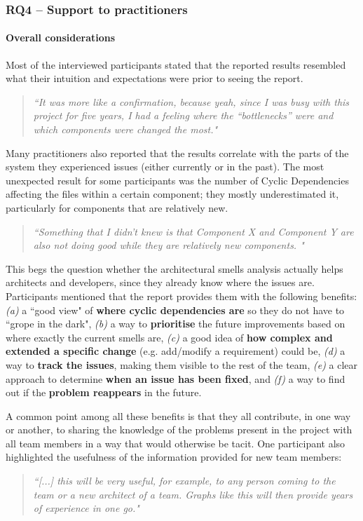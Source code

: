 \subsubsection{RQ4 -- Support to practitioners}\label{c4:sec:results-rq-4}
\paragraph{Overall considerations}
Most of the interviewed participants stated that the reported results resembled what their intuition and expectations were prior to seeing the report.
\begin{quote}
    \emph{``It was more like a confirmation, because yeah, since I was busy with this project for five years, I had a feeling where the “bottlenecks” were and which components were changed the most."}
\end{quote}
Many practitioners also reported that the results correlate with the parts of the system they experienced issues (either currently or in the past).
The most unexpected result for some participants was the number of Cyclic Dependencies affecting the files within a certain component; they mostly underestimated it, particularly for components that are relatively new.
\begin{quote}
   \emph{``Something that I didn’t knew is that Component X and Component Y are also not doing good while they are relatively new components. "}
\end{quote}

This begs the question whether the architectural smells analysis actually helps architects and developers, since they already know where the issues are. Participants mentioned that the report provides them with the following benefits: \emph{(a)} a ``good view" of \textbf{where cyclic dependencies are} so they do not have to ``grope in the dark", \emph{(b)} a way to \textbf{prioritise} the future improvements based on where exactly the current smells are, \emph{(c)} a good idea of \textbf{how complex and extended a specific change} (e.g. add/modify a requirement) could be, \emph{(d)} a way to \textbf{track the issues}, making them visible to the rest of the team, \emph{(e)} a clear approach to determine \textbf{when an issue has been fixed}, and \emph{(f)} a way to find out if the \textbf{problem reappears} in the future.

A common point among all these benefits is that they all contribute, in one way or another, to sharing the knowledge of the problems present in the project with all team members in a way that would otherwise be tacit.
One participant also highlighted the usefulness of the information provided for new team members:
\begin{quote}
    \emph{``[...] this will be very useful, for example, to any person coming to the team or a new architect of a team. Graphs like this will then provide years of experience in one go."}
\end{quote}

